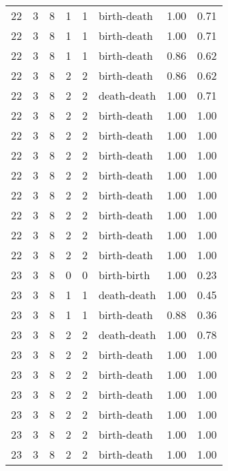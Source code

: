 \documentclass{article}
\begin{document}
\begin{center}
\begin{tabular}{rrrrrlrr}
22 & 3 & 8 & 1 & 1 & birth-death & 1.00 & 0.71 \\
22 & 3 & 8 & 1 & 1 & birth-death & 1.00 & 0.71 \\
22 & 3 & 8 & 1 & 1 & birth-death & 0.86 & 0.62 \\
22 & 3 & 8 & 2 & 2 & birth-death & 0.86 & 0.62 \\
22 & 3 & 8 & 2 & 2 & death-death & 1.00 & 0.71 \\
22 & 3 & 8 & 2 & 2 & birth-death & 1.00 & 1.00 \\
22 & 3 & 8 & 2 & 2 & birth-death & 1.00 & 1.00 \\
22 & 3 & 8 & 2 & 2 & birth-death & 1.00 & 1.00 \\
22 & 3 & 8 & 2 & 2 & birth-death & 1.00 & 1.00 \\
22 & 3 & 8 & 2 & 2 & birth-death & 1.00 & 1.00 \\
22 & 3 & 8 & 2 & 2 & birth-death & 1.00 & 1.00 \\
22 & 3 & 8 & 2 & 2 & birth-death & 1.00 & 1.00 \\
22 & 3 & 8 & 2 & 2 & birth-death & 1.00 & 1.00 \\
23 & 3 & 8 & 0 & 0 & birth-birth & 1.00 & 0.23 \\
23 & 3 & 8 & 1 & 1 & death-death & 1.00 & 0.45 \\
23 & 3 & 8 & 1 & 1 & birth-death & 0.88 & 0.36 \\
23 & 3 & 8 & 2 & 2 & death-death & 1.00 & 0.78 \\
23 & 3 & 8 & 2 & 2 & birth-death & 1.00 & 1.00 \\
23 & 3 & 8 & 2 & 2 & birth-death & 1.00 & 1.00 \\
23 & 3 & 8 & 2 & 2 & birth-death & 1.00 & 1.00 \\
23 & 3 & 8 & 2 & 2 & birth-death & 1.00 & 1.00 \\
23 & 3 & 8 & 2 & 2 & birth-death & 1.00 & 1.00 \\
23 & 3 & 8 & 2 & 2 & birth-death & 1.00 & 1.00 \\
\bottomrule
\end{tabular}


\end{center}
\end{document}
